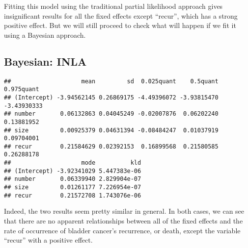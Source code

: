 \documentclass[]{article}
\newenvironment{Shaded}{\begin{snugshade}}{\end{snugshade}}
\newcommand{\DataTypeTok}[1]{\textcolor[rgb]{0.13,0.29,0.53}{#1}}
\newcommand{\DecValTok}[1]{\textcolor[rgb]{0.00,0.00,0.81}{#1}}
\newcommand{\KeywordTok}[1]{\textcolor[rgb]{0.13,0.29,0.53}{\textbf{#1}}}
\newcommand{\NormalTok}[1]{#1}
\newcommand{\OperatorTok}[1]{\textcolor[rgb]{0.81,0.36,0.00}{\textbf{#1}}}
\newcommand{\OtherTok}[1]{\textcolor[rgb]{0.56,0.35,0.01}{#1}}
\newcommand{\StringTok}[1]{\textcolor[rgb]{0.31,0.60,0.02}{#1}}
\begin{document}
Fitting this model using the traditional partial likelihood approach
gives insignificant results for all the fixed effects except ``recur'',
which has a strong positive effect. But we will still proceed to check
what will happen if we fit it using a Bayesian approach.

\hypertarget{bayesian-inla-1}{%
\subsection{Bayesian: INLA}\label{bayesian-inla-1}}

\begin{Shaded}
\end{Shaded}

\begin{verbatim}
##                    mean         sd  0.025quant    0.5quant  0.975quant
## (Intercept) -3.94562145 0.26869175 -4.49396072 -3.93815470 -3.43930333
## number       0.06132863 0.04045249 -0.02007876  0.06202240  0.13881952
## size         0.00925379 0.04631394 -0.08484247  0.01037919  0.09704001
## recur        0.21584629 0.02392153  0.16899568  0.21580585  0.26288178
##                    mode          kld
## (Intercept) -3.92341029 5.447383e-06
## number       0.06339940 2.829904e-07
## size         0.01261177 7.226954e-07
## recur        0.21572708 1.743076e-06
\end{verbatim}

Indeed, the two results seem pretty similar in general. In both cases,
we can see that there are no apparent relationships between all of the
fixed effects and the rate of occurrence of bladder cancer's recurrence,
or death, except the variable ``recur'' with a positive effect.
\end{document}
